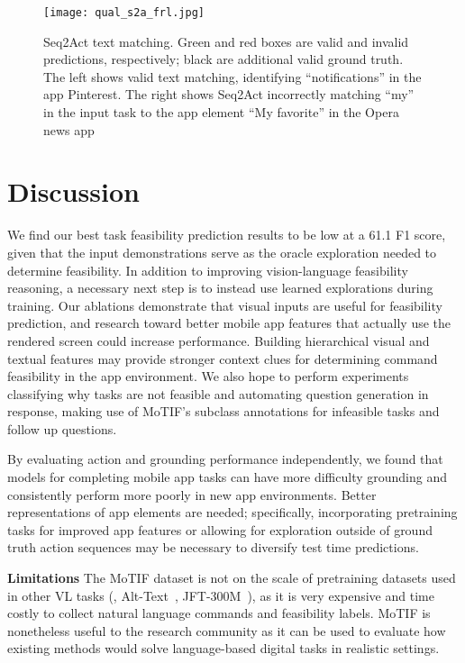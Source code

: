 \begin{figure}[t]
    \centering
    \texttt{[image: qual\_s2a\_frl.jpg]}
    \caption{Seq2Act text matching. Green and red boxes are valid and invalid predictions, respectively; black are additional valid ground truth. The left shows valid text matching, identifying ``notifications'' in the app Pinterest. The right shows Seq2Act incorrectly matching ``my'' in the input task to the app element ``My favorite'' in the Opera news app}
    \label{fig:qual}
\end{figure}
\section{Discussion}
We find our best task feasibility prediction results to be low at a 61.1 F1 score, given that the input demonstrations serve as the oracle exploration needed to determine feasibility. In addition to improving vision-language feasibility reasoning, a necessary next step is to instead use learned explorations during training. Our ablations demonstrate that visual inputs are useful for feasibility prediction, and research toward better mobile app features that actually use the rendered screen could increase performance. 
Building hierarchical visual and textual features may provide stronger context clues for determining command feasibility in the app environment. We also hope to perform experiments classifying why tasks are not feasible and automating question generation in response, making use of MoTIF's subclass annotations for infeasible tasks and follow up questions.

By evaluating action and grounding performance independently, we found that models for completing mobile app tasks can have more difficulty grounding and consistently perform more poorly in new app environments. 
Better representations of app elements are needed;
specifically, incorporating pretraining tasks for improved app features or allowing for exploration outside of ground truth action sequences may be necessary to diversify test time predictions.

\smallskip
\noindent\textbf{Limitations}
The MoTIF dataset is not on the scale of pretraining datasets used in other VL tasks (\eg, Alt-Text~\cite{jia2021scaling}, JFT-300M~\cite{jft300}), as it is very expensive and time costly to collect natural language commands and feasibility labels. MoTIF is nonetheless useful to the research community as it can be used to evaluate how existing methods would solve language-based digital tasks in realistic settings.

